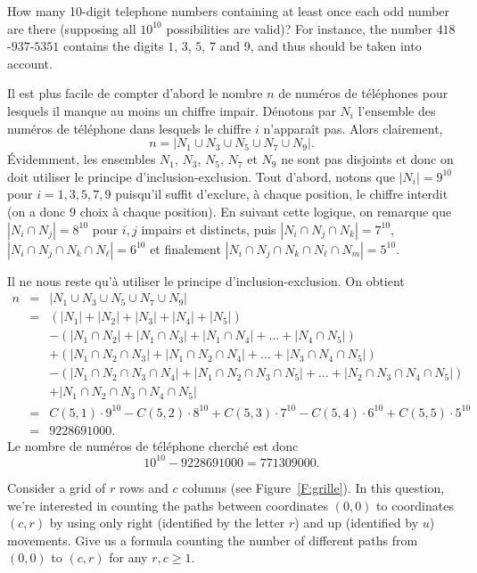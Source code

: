 \documentclass[12pt,addpoints]{exam}
\begin{document}
\begin{questions}
\question
How many 10-digit telephone numbers containing at least once each odd number are there (supposing all $10^{10}$ possibilities are valid)? For instance, the number $418$-$937$-$5351$ contains the digits $1$, $3$, $5$, $7$ and $9$, and thus should be taken into account.
\begin{solution}
Il est plus facile de compter d'abord le nombre $n$ de numéros de téléphones pour lesquels il manque au moins un chiffre impair. Dénotons par $N_i$ l'ensemble des numéros de téléphone dans lesquels le chiffre $i$ n'apparaît pas. Alors clairement, 
$$n = \left| N_1 \cup N_3 \cup N_5 \cup N_7 \cup N_9 \right|.$$
Évidemment, les ensembles $N_1$, $N_3$, $N_5$, $N_7$ et $N_9$ ne sont pas disjoints et donc on doit utiliser le principe d'inclusion-exclusion. Tout d'abord, notons que $|N_i| = 9^{10}$ pour $i = 1,3,5,7,9$ puisqu'il suffit d'exclure, à chaque position, le chiffre interdit (on a donc $9$ choix à chaque position). En suivant cette logique, on remarque que $|N_i \cap N_j| = 8^{10}$ pour $i,j$ impairs et distincts, puis $|N_i \cap N_j \cap N_k| = 7^{10}$, $|N_i \cap N_j \cap N_k \cap N_\ell| = 6^{10}$ et finalement $|N_i \cap N_j \cap N_k \cap N_\ell \cap N_m| = 5^{10}$.

Il ne nous reste qu'à utiliser le principe d'inclusion-exclusion. On obtient
\begin{eqnarray*}
  n & = & \left| N_1 \cup N_3 \cup N_5 \cup N_7 \cup N_9 \right| \\
    & = & (|N_1| + |N_2| + |N_3| + |N_4| + |N_5|) \\
    &   & - (|N_1 \cap N_2| + |N_1 \cap N_3| + |N_1 \cap N_4| + \ldots + |N_4 \cap N_5|) \\
    &   & + (|N_1 \cap N_2 \cap N_3| + |N_1 \cap N_2 \cap N_4| + \ldots + |N_3 \cap N_4 \cap N_5|) \\
    &   & - (|N_1 \cap N_2 \cap N_3 \cap N_4| + |N_1 \cap N_2 \cap N_3 \cap N_5| + \ldots + |N_2 \cap N_3 \cap N_4 \cap N_5|) \\
    &   & + |N_1 \cap N_2 \cap N_3 \cap N_4 \cap N_5| \\
    & = & C(5,1) \cdot 9^{10} - C(5,2) \cdot 8^{10} + C(5,3) \cdot 7^{10} - C(5,4) \cdot 6^{10} + C(5,5) \cdot 5^{10} \\
    & = & 9228691000.
\end{eqnarray*}
Le nombre de numéros de téléphone cherché est donc
$$10^{10} - 9228691000 = 771309000.$$
\end{solution}

\question
Consider a grid of $r$ rows and $c$ columns (see Figure~\ref{F:grille}). In this question, we're interested in counting the paths between coordinates $(0,0)$ to coordinates $(c,r)$ by using only right (identified by the letter $r$) and up (identified by $u$) movements. Give us a formula counting the number of different paths from $(0,0)$ to $(c,r)$ for any $r,c \geq 1$.


\end{questions}
\end{document}
